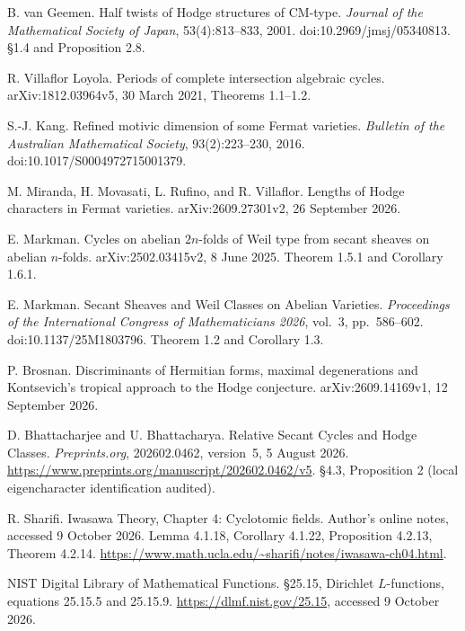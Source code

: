 B. van Geemen.
\newblock Half twists of Hodge structures of CM-type.
\newblock \emph{Journal of the Mathematical Society of Japan}, 53(4):813--833, 2001.
\newblock doi:10.2969/jmsj/05340813.
\newblock \S1.4 and Proposition 2.8.

R. Villaflor Loyola.
\newblock Periods of complete intersection algebraic cycles.
\newblock arXiv:1812.03964v5, 30 March 2021, Theorems 1.1--1.2.

S.-J. Kang.
\newblock Refined motivic dimension of some Fermat varieties.
\newblock \emph{Bulletin of the Australian Mathematical Society}, 93(2):223--230, 2016.
\newblock doi:10.1017/S0004972715001379.

M. Miranda, H. Movasati, L. Rufino, and R. Villaflor.
\newblock Lengths of Hodge characters in Fermat varieties.
\newblock arXiv:2609.27301v2, 26 September 2026.

E. Markman.
\newblock Cycles on abelian $2n$-folds of Weil type from secant sheaves on abelian $n$-folds.
\newblock arXiv:2502.03415v2, 8 June 2025.
\newblock Theorem 1.5.1 and Corollary 1.6.1.

E. Markman.
\newblock Secant Sheaves and Weil Classes on Abelian Varieties.
\newblock \emph{Proceedings of the International Congress of Mathematicians 2026},
vol.~3, pp.~586--602.
\newblock doi:10.1137/25M1803796.
\newblock Theorem 1.2 and Corollary 1.3.

P. Brosnan.
\newblock Discriminants of Hermitian forms, maximal degenerations and Kontsevich's tropical approach to the Hodge conjecture.
\newblock arXiv:2609.14169v1, 12 September 2026.

D. Bhattacharjee and U. Bhattacharya.
\newblock Relative Secant Cycles and Hodge Classes.
\newblock \emph{Preprints.org}, 202602.0462, version~5, 5 August 2026.
\newblock \url{https://www.preprints.org/manuscript/202602.0462/v5}.
\newblock \S4.3, Proposition 2 (local eigencharacter identification audited).

R. Sharifi.
\newblock Iwasawa Theory, Chapter 4: Cyclotomic fields.
\newblock Author's online notes, accessed 9 October 2026.
\newblock Lemma 4.1.18, Corollary 4.1.22, Proposition 4.2.13, Theorem 4.2.14.
\newblock \url{https://www.math.ucla.edu/~sharifi/notes/iwasawa-ch04.html}.

NIST Digital Library of Mathematical Functions.
\newblock \S25.15, Dirichlet $L$-functions, equations 25.15.5 and 25.15.9.
\newblock \url{https://dlmf.nist.gov/25.15}, accessed 9 October 2026.
